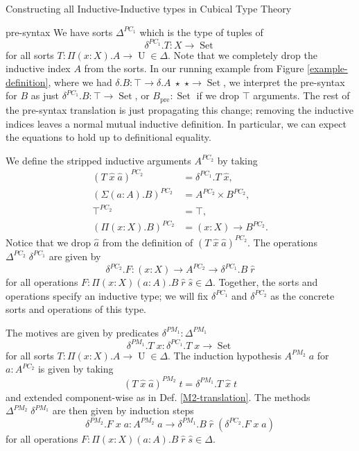 \documentclass[runningheads]{llncs}
\DeclareMathOperator{\USet}{Set}
\DeclareMathOperator{\UU}{U}
\newcommand{\pre}[1]{{#1}_\text{pre}}
\begin{document}
{\begin{section}{Constructing all Inductive-Inductive types in Cubical Type Theory}
\begin{subsection}{pre-syntax}
We have sorts $\Delta^{PC_1}$ which is the type of tuples of \[\delta^{PC_1}.T : X \to \USet\] for all sorts $T : \Pi(x : X).A\to\UU \in\Delta$. Note that we completely drop the inductive index $A$ from the sorts. In our running example from Figure \ref{example-definition}, where we had $\delta.B : \top \to \delta.A\;\star\;\star \to \USet$, we interpret the pre-syntax for $B$ as just $\delta^{PC_1}.B : \top \to \USet$, or $\pre{B} : \USet$ if we drop $\top$ arguments. The rest of the pre-syntax translation is just propagating this change; removing the inductive indices leaves a normal mutual inductive definition. In particular, we can expect the equations to hold up to definitional equality.

We define the stripped inductive arguments $A^{PC_2}$ by taking
\begin{align*}
(T\;\hat{x}\;\hat{a})^{PC_2} &= \delta^{PC_1}.T\;\hat{x},\\
(\Sigma(a : A).B)^{PC_2} &= A^{PC_2}\times B^{PC_2},\\
\top^{PC_2} &= \top,\\
(\Pi(x : X).B)^{PC_2} &= (x : X) \to B^{PC_2}.
\end{align*} Notice that we drop $\hat{a}$ from the definition of $(T\;\hat{x}\;\hat{a})^{PC_2}$.
The operations $\Delta^{PC_2}\;\delta^{PC_1}$ are given by \[\delta^{PC_2}.F : (x : X) \to A^{PC_2} \to \delta^{PC_1}.B\;\hat{r}\] for all operations $F : \Pi(x : X)(a : A).B\;\hat{r}\;\hat{s} \in \Delta$. Together, the sorts and operations specify an inductive type; we will fix $\delta^{PC_1}$ and $\delta^{PC_2}$ as the concrete sorts and operations of this type.

The motives are given by predicates $\delta^{PM_1} : \Delta^{PM_1}$ \[\delta^{PM_1}.T\;x : \delta^{PC_1}.T\;x\to \USet\] for all sorts $T : \Pi(x : X).A\to\UU \in\Delta$. The induction hypothesis $A^{PM_2}\;a$ for $a : A^{PC_2}$ is given by taking \[(T\;\hat{x}\;\hat{a})^{PM_2}\;t = \delta^{PM_1}.T\;\hat{x}\;t\] and extended component-wise as in Def. \ref{M2-translation}. The methods $\Delta^{PM_2}\;\delta^{PM_1}$ are then given by induction steps \[\delta^{PM_2}.F\;x\;a : A^{PM_2}\;a \to \delta^{PM_1}.B\;\hat{r}\;(\delta^{PC_2}.F\;x\;a)\] for all operations $F : \Pi(x : X)(a : A).B\;\hat{r}\;\hat{s} \in \Delta$.


\end{subsection}
\end{section}}
\end{document}
